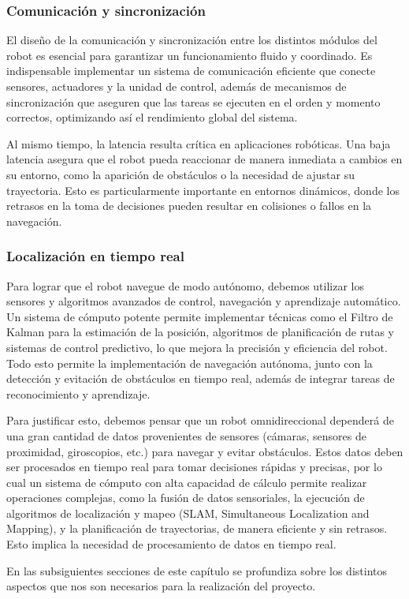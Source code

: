 \subsubsection{Comunicación y sincronización}
El diseño de la comunicación y sincronización entre los distintos módulos del robot es esencial para garantizar un funcionamiento fluido y coordinado. Es indispensable implementar un sistema de comunicación eficiente que conecte sensores, actuadores y la unidad de control, además de mecanismos de sincronización que aseguren que las tareas se ejecuten en el orden y momento correctos, optimizando así el rendimiento global del sistema. \cite{lee2017introduction}

Al mismo tiempo, la latencia resulta crítica en aplicaciones robóticas. Una baja latencia asegura que el robot pueda reaccionar de manera inmediata a cambios en su entorno, como la aparición de obstáculos o la necesidad de ajustar su trayectoria. Esto es particularmente importante en entornos dinámicos, donde los retrasos en la toma de decisiones pueden resultar en colisiones o fallos en la navegación. \cite{tzafestas2013introduction}


\subsubsection{Localización en tiempo real}

Para lograr que el robot navegue de modo autónomo, debemos utilizar los sensores y algoritmos avanzados de control, navegación y aprendizaje automático. Un sistema de cómputo potente permite implementar técnicas como el Filtro de Kalman para la estimación de la posición, algoritmos de planificación de rutas y sistemas de control predictivo, lo que mejora la precisión y eficiencia del robot. \cite{tzafestas2013introduction} Todo esto permite la implementación de navegación autónoma, junto con la detección y evitación de obstáculos en tiempo real, además de integrar tareas de reconocimiento y aprendizaje.

Para justificar esto, debemos pensar que un robot omnidireccional dependerá de una gran cantidad de datos provenientes de sensores (cámaras, sensores de proximidad, giroscopios, etc.) para navegar y evitar obstáculos. Estos datos deben ser procesados en tiempo real para tomar decisiones rápidas y precisas, por lo cual un sistema de cómputo con alta capacidad de cálculo permite realizar operaciones complejas, como la fusión de datos sensoriales, la ejecución de algoritmos de localización y mapeo (SLAM, Simultaneous Localization and Mapping), y la planificación de trayectorias, de manera eficiente y sin retrasos. Esto implica la necesidad de procesamiento de datos en tiempo real. \cite{sariffpathplan}

En las subsiguientes secciones de este capítulo se profundiza sobre los distintos aspectos que nos son necesarios para la realización del proyecto.

